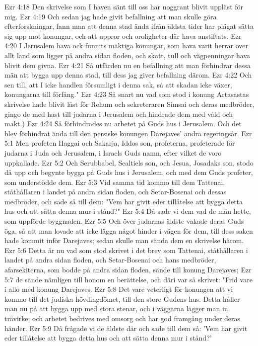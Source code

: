 Ezr 4:18  Den skrivelse som I haven sänt till oss har noggrant blivit uppläst för mig.
Ezr 4:19  Och sedan jag hade givit befallning att man skulle göra efterforskningar, fann man att denna stad ända ifrån äldsta tider har plägat sätta sig upp mot konungar, och att uppror och oroligheter där hava anstiftats.
Ezr 4:20  I Jerusalem hava ock funnits mäktiga konungar, som hava varit herrar över allt land som ligger på andra sidan floden, och skatt, tull och vägpenningar hava blivit dem givna.
Ezr 4:21  Så utfärden nu en befallning att man förhindrar dessa män att bygga upp denna stad, till dess jag giver befallning därom.
Ezr 4:22  Och sen till, att I icke handlen försumligt i denna sak, så att skadan icke växer, konungarna till förfång."
Ezr 4:23  Så snart nu vad som stod i konung Artasastas skrivelse hade blivit läst för Rehum och sekreteraren Simsai och deras medbröder, gingo de med hast till judarna i Jerusalem och hindrade dem med våld och makt.)
Ezr 4:24  Så förhindrades nu arbetet på Guds hus i Jerusalem. Och det blev förhindrat ända till den persiske konungen Darejaves' andra regeringsår.
Ezr 5:1  Men profeten Haggai och Sakarja, Iddos son, profeterna, profeterade för judarna i Juda och Jerusalem, i Israels Guds namn, efter vilket de voro uppkallade.
Ezr 5:2  Och Serubbabel, Sealtiels son, och Jesua, Josadaks son, stodo då upp och begynte bygga på Guds hus i Jerusalem, och med dem Guds profeter, som understödde dem.
Ezr 5:3  Vid samma tid kommo till dem Tattenai, ståthållaren i landet på andra sidan floden, och Setar-Bosenai och dessas medbröder, och sade så till dem: "Vem har givit eder tillåtelse att bygga detta hus och att sätta denna mur i stånd?"
Ezr 5:4  Då sade vi dem vad de män hette, som uppförde byggnaden.
Ezr 5:5  Och över judarnas äldste vakade deras Guds öga, så att man lovade att icke lägga något hinder i vägen för dem, till dess saken hade kommit inför Darejaves; sedan skulle man sända dem en skrivelse härom.
Ezr 5:6  Detta är nu vad som stod skrivet i det brev som Tattenai, ståthållaren i landet på andra sidan floden, och Setar-Bosenai och hans medbröder, afarsekiterna, som bodde på andra sidan floden, sände till konung Darejaves;
Ezr 5:7  de sände nämligen till honom en berättelse, och däri var så skrivet: "Frid vare i allo med konung Darejaves.
Ezr 5:8  Det vare veterligt för konungen att vi kommo till det judiska hövdingdömet, till den store Gudens hus. Detta håller man nu på att bygga upp med stora stenar, och i väggarna lägger man in trävirke; och arbetet bedrives med omsorg och har god framgång under deras händer.
Ezr 5:9  Då frågade vi de äldste där och sade till dem så: 'Vem har givit eder tillåtelse att bygga detta hus och att sätta denna mur i stånd?'
